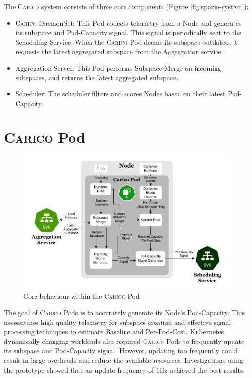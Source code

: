 The \textsc{Carico} system consists of three core components (Figure
\ref{fig:spazio-system}):
\begin{itemize}
    \item \textsc{Carico} DaemonSet: This Pod collects telemetry from a
        Node and generates its subspace and Pod-Capacity  signal. This signal is
        periodically sent to the Scheduling Service. When the \textsc{Carico}
        Pod deems its subspace outdated, it requests the latest aggregated
        subspace from the Aggregation service.
    \item Aggregation Server: This Pod performs Subspace-Merge on incoming
        subspaces, and returns the latest aggregated subspace.
    \item Scheduler: The scheduler filters and scores Nodes based on their
        latest Pod-Capacity.
\end{itemize}

\section{\textsc{Carico} Pod}
\begin{figure}[ht!]
    \centering
    \includegraphics[width=\textwidth]{images/carico-pod.pdf}
    \caption{Core behaviour within the \textsc{Carico} Pod}
    \label{spazio-pod-components}
\end{figure}
The goal of \textsc{Carico} Pods is to accurately generate its Node's
Pod-Capacity. This necessitates high quality telemetry for subspace creation and
effective signal processing techniques to estimate Baseline and Per-Pod-Cost.
Kubernetes dynamically changing workloads also required \textsc{Carico} Pods to
frequently update its subspace and Pod-Capacity signal. However, updating too
frequently could result in large overheads and reduce the available resources.
Investigations using the prototype showed that an update frequency of 1Hz
achieved the best results.


